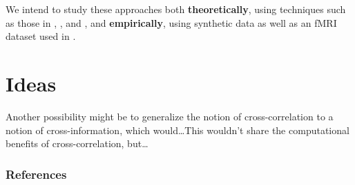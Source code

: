 \documentclass{article} %
\begin{document}
We intend to study these approaches both {\bf theoretically}, using techniques
such as those in \cite{kandasamy2014influence}, \cite{moon14ensemble}, and
\cite{singh14densityfunc}, and {\bf empirically}, using synthetic data as well 
as an fMRI dataset used in \cite{Clute14OHBM}.

\section{Ideas}

Another possibility might be to generalize the notion of cross-correlation to a
notion of cross-information, which would\dots This wouldn't share the
computational benefits of cross-correlation, but\dots

\subsubsection*{References}
\setlength{\bibsep}{0.0pt}
{


}
\end{document}
